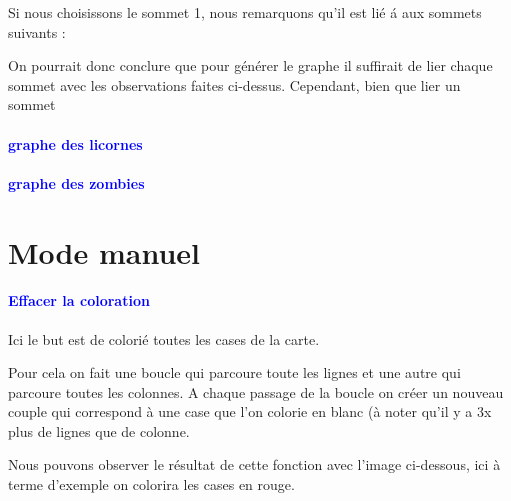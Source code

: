 \documentclass{report}
\begin{document}
			Si nous choisissons le sommet 1, nous remarquons qu'il est li\'e \'a aux sommets suivants :
			
			
			On pourrait donc conclure que pour générer le graphe il suffirait de lier chaque sommet avec les observations faites ci-dessus. Cependant, bien que lier un sommet
			
			
			
			
			
			
			\paragraph{\textcolor{blue}{graphe des licornes}}
			\paragraph{\textcolor{blue}{graphe des zombies}}
		\section{Mode manuel}
			\paragraph{\textcolor{blue}{Effacer la coloration}}
			Ici le but est de colorié toutes les cases de la carte.
			
		Pour cela on fait une boucle qui parcoure toute les lignes  et une autre qui parcoure toutes les colonnes. A chaque passage de la boucle on créer un nouveau couple qui correspond à une case que l'on colorie en blanc (à noter qu'il y a 3x plus de lignes que de colonne.	 	
			
			Nous pouvons observer le résultat de cette fonction avec l'image ci-dessous, ici à terme d'exemple on colorira les cases en rouge.
			
\end{document}
